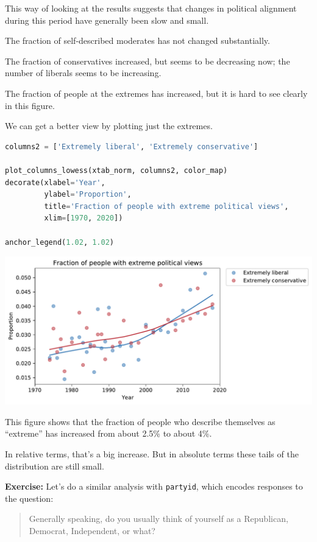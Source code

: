 This way of looking at the results suggests that changes in political
alignment during this period have generally been slow and small.

The fraction of self-described moderates has not changed substantially.

The fraction of conservatives increased, but seems to be decreasing now;
the number of liberals seems to be increasing.

The fraction of people at the extremes has increased, but it is hard to
see clearly in this figure.

We can get a better view by plotting just the extremes.

\begin{lstlisting}[language=Python]
columns2 = ['Extremely liberal', 'Extremely conservative']

plot_columns_lowess(xtab_norm, columns2, color_map)
decorate(xlabel='Year',
         ylabel='Proportion',
         title='Fraction of people with extreme political views',
         xlim=[1970, 2020])

anchor_legend(1.02, 1.02)
\end{lstlisting}

\begin{center}
\includegraphics[scale=0.75]{02_polviews_files/02_polviews_89_0.pdf}
\end{center}

This figure shows that the fraction of people who describe themselves as
``extreme'' has increased from about 2.5\% to about 4\%.

In relative terms, that's a big increase. But in absolute terms these
tails of the distribution are still small.

\textbf{Exercise:} Let's do a similar analysis with
\passthrough{\lstinline!partyid!}, which encodes responses to the
question:

\begin{quote}
Generally speaking, do you usually think of yourself as a Republican,
Democrat, Independent, or what?
\end{quote}

